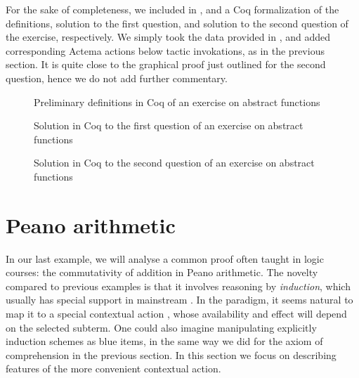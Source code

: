 For the sake of completeness, we included in ,
 and  a Coq formalization of the
definitions, solution to the first question, and solution to the second question
of the exercise, respectively. We simply took the data provided in
\cite{bartzia:hal-04087080}, and added corresponding Actema actions below tactic
invokations, as in the previous section. It is quite close to the graphical proof
just outlined for the second question, hence we do not add further commentary.

\begin{figure}
  
  \caption{Preliminary definitions in Coq of an exercise on abstract functions}
\end{figure}

\begin{figure}
  
  \caption{Solution in Coq to the first question of an exercise on abstract functions}
\end{figure}

\begin{figure}
  
  \caption{Solution in Coq to the second question of an exercise on abstract functions}
\end{figure}


\section{Peano arithmetic}

In our last example, we will analyse a common proof often taught in logic
courses: the commutativity of addition in Peano arithmetic. The novelty compared
to previous examples is that it involves reasoning by \emph{induction}, which
usually has special support in mainstream . In the
 paradigm, it seems natural to map it to a special contextual
action , whose availability and effect will depend on the
selected subterm. One could also imagine manipulating explicitly induction
schemes as blue items, in the same way we did for the axiom of comprehension in
the previous section. In this section we focus on describing features of the
more convenient contextual action.


